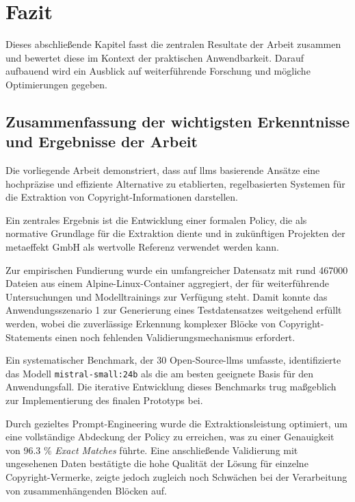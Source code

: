\chapter{Fazit}\label{ch:fazit}

Dieses abschließende Kapitel fasst die zentralen Resultate der Arbeit zusammen und bewertet diese im Kontext der praktischen Anwendbarkeit.
Darauf aufbauend wird ein Ausblick auf weiterführende Forschung und mögliche Optimierungen gegeben.


\section{Zusammenfassung der wichtigsten Erkenntnisse und Ergebnisse der Arbeit}

Die vorliegende Arbeit demonstriert, dass auf \glspl{llm} basierende Ansätze eine hochpräzise und effiziente Alternative zu etablierten, regelbasierten Systemen für die Extraktion von Copyright-Informationen darstellen.

Ein zentrales Ergebnis ist die Entwicklung einer formalen Policy, die als normative Grundlage für die Extraktion diente und in zukünftigen Projekten der metaeffekt GmbH als wertvolle Referenz verwendet werden kann.

Zur empirischen Fundierung wurde ein umfangreicher Datensatz mit rund \num{467000} Dateien aus einem Alpine-Linux-Container aggregiert, der für weiterführende Untersuchungen und Modelltrainings zur Verfügung steht.
Damit konnte das Anwendungsszenario 1 zur Generierung eines Testdatensatzes weitgehend erfüllt werden, wobei die zuverlässige Erkennung komplexer Blöcke von Copyright-Statements einen noch fehlenden Validierungsmechanismus erfordert.

Ein systematischer Benchmark, der 30 Open-Source-\glspl{llm} umfasste, identifizierte das Modell \texttt{mistral-small:24b} als die am besten geeignete Basis für den Anwendungsfall.
Die iterative Entwicklung dieses Benchmarks trug maßgeblich zur Implementierung des finalen Prototyps bei.

Durch gezieltes Prompt-Engineering wurde die Extraktionsleistung optimiert, um eine vollständige Abdeckung der Policy zu erreichen, was zu einer Genauigkeit von \num{96,3} \% \textit{Exact Matches} führte.
Eine anschließende Validierung mit ungesehenen Daten bestätigte die hohe Qualität der Lösung für einzelne Copyright-Vermerke, zeigte jedoch zugleich noch Schwächen bei der Verarbeitung von zusammenhängenden Blöcken auf.

